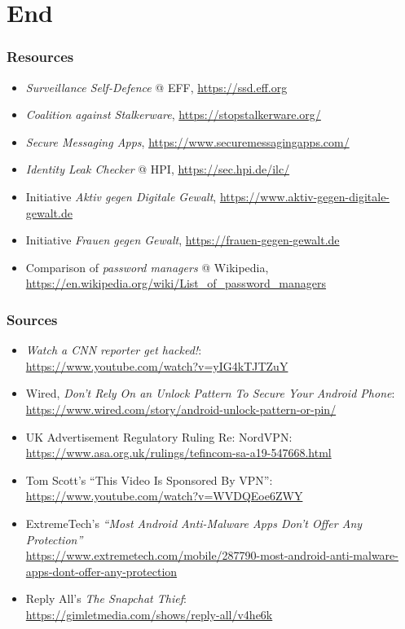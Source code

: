 \documentclass[aspectratio=1610,dvipsnames]{beamer}
\newcommand{\backupbegin}{
   \newcounter{finalframe}
   \setcounter{finalframe}{\value{framenumber}}
}
\newcommand{\backupend}{
   \setcounter{framenumber}{\value{finalframe}}
}
\begin{document}
\appendix
\backupbegin

\section{End}

\begin{frame}
\frametitle{Resources}

\begin{itemize}
\item \emph{Surveillance Self-Defence} @ EFF, \url{https://ssd.eff.org}
\item \emph{Coalition against Stalkerware}, \url{https://stopstalkerware.org/}
\item \emph{Secure Messaging Apps}, \url{https://www.securemessagingapps.com/}
\item \emph{Identity Leak Checker} @ HPI, \url{https://sec.hpi.de/ilc/}
\item Initiative \emph{Aktiv gegen Digitale Gewalt}, \url{https://www.aktiv-gegen-digitale-gewalt.de}
\item Initiative \emph{Frauen gegen Gewalt}, \url{https://frauen-gegen-gewalt.de}
\item Comparison of \emph{password managers} @ Wikipedia, \url{https://en.wikipedia.org/wiki/List_of_password_managers}
\end{itemize}

\end{frame}

\begin{frame}
\frametitle{Sources}
\footnotesize

\begin{itemize}
\item \emph{Watch a CNN reporter get hacked!}:\\
\url{https://www.youtube.com/watch?v=yIG4kTJTZuY}
\item Wired, \emph{Don't Rely On an Unlock Pattern To Secure Your Android Phone}: \\
\url{https://www.wired.com/story/android-unlock-pattern-or-pin/}
\item UK Advertisement Regulatory Ruling Re: NordVPN:\\
\url{https://www.asa.org.uk/rulings/tefincom-sa-a19-547668.html}
\item Tom Scott's ``This Video Is Sponsored By VPN'':\\
\url{https://www.youtube.com/watch?v=WVDQEoe6ZWY}
\item ExtremeTech's \emph{``Most Android Anti-Malware Apps Don’t Offer Any Protection''}\\
\url{https://www.extremetech.com/mobile/287790-most-android-anti-malware-apps-dont-offer-any-protection}
\item Reply All's \emph{The Snapchat Thief}:\\
\url{https://gimletmedia.com/shows/reply-all/v4he6k}
\end{itemize}

\end{frame}

\backupend
\end{document}
